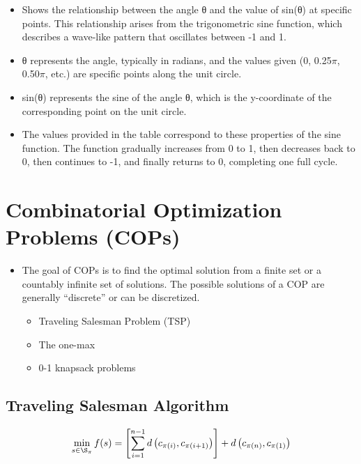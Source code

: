 \documentclass[
  letterpaper,
  DIV=11,
  numbers=noendperiod]{scrreprt}
\providecommand{\tightlist}{%
  \setlength{\itemsep}{0pt}\setlength{\parskip}{0pt}}\usepackage{longtable,booktabs,array}
\begin{document}
\begin{itemize}
\tightlist
\item
  Shows the relationship between the angle θ and the value of sin⁡(θ) at
  specific points. This relationship arises from the trigonometric sine
  function, which describes a wave-like pattern that oscillates between
  -1 and 1.
\item
  θ represents the angle, typically in radians, and the values given (0,
  0.25\(\pi\), 0.50\(\pi\), etc.) are specific points along the unit
  circle.
\item
  sin(θ) represents the sine of the angle θ, which is the y-coordinate
  of the corresponding point on the unit circle.
\item
  The values provided in the table correspond to these properties of the
  sine function. The function gradually increases from 0 to 1, then
  decreases back to 0, then continues to -1, and finally returns to 0,
  completing one full cycle.
\end{itemize}


\chapter{Combinatorial Optimization Problems
(COPs)}\label{combinatorial-optimization-problems-cops}

\begin{itemize}
\tightlist
\item
  The goal of COPs is to find the optimal solution from a finite set or
  a countably infinite set of solutions. The possible solutions of a COP
  are generally ``discrete'' or can be discretized.

  \begin{itemize}
  \tightlist
  \item
    Traveling Salesman Problem (TSP)
  \item
    The one-max
  \item
    0-1 knapsack problems
  \end{itemize}
\end{itemize}

\section{Traveling Salesman
Algorithm}\label{traveling-salesman-algorithm}

\[\min_{s \in \S_{\pi}} f(s) = \left[ \sum_{i=1}^{n-1} d\left(c_{\pi(i)}, c_{\pi(i+1)}\right) \right] + d\left(c_{\pi(n)}, c_{\pi(1)}\right)\]
\end{document}
